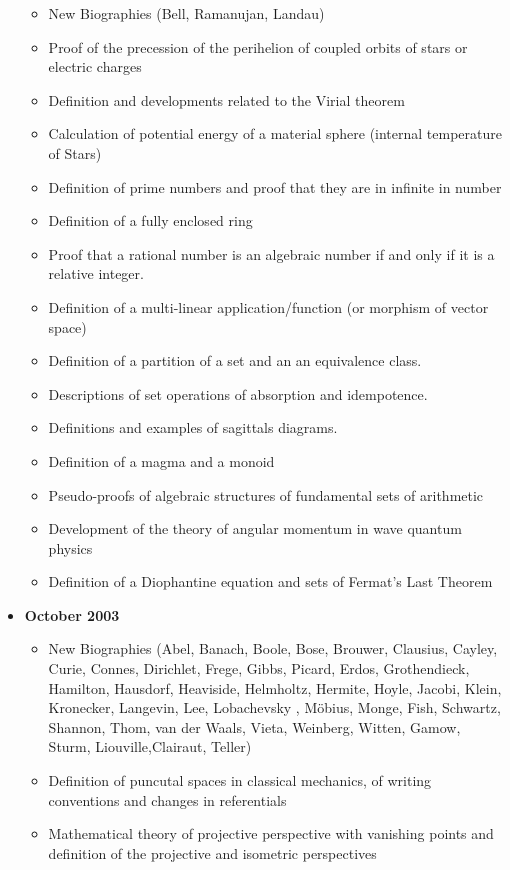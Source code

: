 \documentclass[12pt,a4paper,twoside,openright]{report}
\newcounter{def}
\theoremstyle{definition}
\theoremstyle{itexmp}
\numberwithin{equation}{section}
\begin{document}
\begin{itemize}
			\begin{itemize}[noitemsep]
				\item New Biographies (Bell, Ramanujan, Landau)
				\item Proof of the precession of the perihelion of coupled orbits of stars or electric charges
				\item Definition and developments related to the Virial theorem
				\item Calculation of potential energy of a material sphere (internal temperature of Stars)
				\item Definition of prime numbers and proof that they are in infinite in number
				\item Definition of a fully enclosed ring
				\item Proof that a rational number is an algebraic number if and only if it is a relative integer.
				\item Definition of a multi-linear application/function (or morphism of vector space)
				\item Definition of a partition of a set and an an equivalence class.
				\item Descriptions of set operations of absorption and idempotence.
				\item Definitions and examples of sagittals diagrams.
				\item Definition of a magma and a monoid
				\item Pseudo-proofs of algebraic structures of fundamental sets of arithmetic
				\item Development of the theory of angular momentum in wave quantum physics
				\item Definition of a Diophantine equation and sets of Fermat's Last Theorem
			\end{itemize}
		\item \textbf{October 2003}
			\begin{itemize}[noitemsep]
				\item New Biographies (Abel, Banach, Boole, Bose, Brouwer, Clausius, Cayley, Curie,  Connes, Dirichlet, Frege, Gibbs, Picard, Erdos, Grothendieck, Hamilton, Hausdorf,  Heaviside, Helmholtz, Hermite, Hoyle, Jacobi, Klein, Kronecker, Langevin, Lee, Lobachevsky , Möbius, Monge, Fish, Schwartz, Shannon, Thom, van der Waals, Vieta, Weinberg, Witten, Gamow, Sturm, Liouville,Clairaut, Teller)
				\item Definition of puncutal spaces in classical mechanics, of writing conventions and changes in referentials
				\item Mathematical theory of projective perspective with vanishing points and definition of the projective and isometric perspectives

\end{itemize}
\end{itemize}
\end{document}
